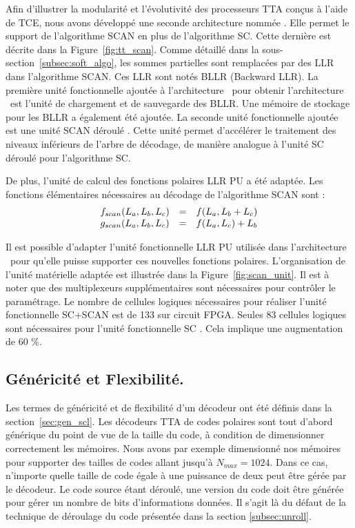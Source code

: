Afin d'illustrer la modularité et l'évolutivité des processeurs TTA conçus à l'aide de TCE, nous avons développé une seconde architecture nommée \TTSCAN. Elle permet le support de l'algorithme SCAN en plus de l'algorithme SC. Cette dernière est décrite dans la Figure~\ref{fig:tt_scan}.
Comme détaillé dans la sous-section~\ref{subsec:soft_algo}, les sommes partielles sont remplacées par des LLR dans l'algorithme SCAN. Ces LLR sont notés BLLR (Backward LLR). La première unité fonctionnelle ajoutée à l'architecture \TTSC~pour obtenir l'architecture \TTSCAN~est l'unité de chargement et de sauvegarde des BLLR. Une mémoire de stockage pour les BLLR a également été ajoutée. La seconde unité fonctionnelle ajoutée est une unité \og SCAN déroulé \fg. Cette unité permet d'accélérer le traitement des niveaux inférieurs de l'arbre de décodage, de manière analogue à l'unité \og SC déroulé \fg pour l'algorithme SC.

De plus, l'unité de calcul des fonctions polaires LLR PU a été adaptée. Les fonctions élémentaires nécessaires au décodage de l'algorithme SCAN sont : 
\begin{eqnarray}
  \begin{array}{l c l}
    f_{scan}(L_a,L_b,L_c) & = & f(L_a, L_b  + L_c) \\
    g_{scan}(L_a,L_b,L_c) & = & f(L_a, L_c) + L_b
  \end{array}
  \label{eq:bp}
\end{eqnarray}


Il est possible d'adapter l'unité fonctionnelle LLR PU utilisée dans l'architecture \TTSC~pour qu'elle puisse supporter ces nouvelles fonctions polaires. L'organisation de l'unité matérielle adaptée est illustrée dans la Figure~\ref{fig:scan_unit}. Il est à noter que des multiplexeurs supplémentaires sont nécessaires pour contrôler le paramétrage. Le nombre de cellules logiques nécessaires pour réaliser l'unité fonctionnelle \og SC+SCAN \fg est de 133 sur circuit FPGA. Seules 83 cellules logiques sont nécessaires pour l'unité fonctionnelle \og SC \fg. Cela implique une augmentation de 60 \%.

\subsection{Généricité et Flexibilité.}
Les termes de généricité et de flexibilité d'un décodeur ont été définis dans la section~\ref{sec:gen_scl}. Les décodeurs TTA de codes polaires sont tout d'abord générique du point de vue de la taille du code, à condition de dimensionner correctement les mémoires. Nous avons par exemple dimensionné nos mémoires pour supporter des tailles de codes allant jusqu'à $N_{max}=1024$. Dans ce cas, n'importe quelle taille de code égale à une puissance de deux peut être gérée par le décodeur. Le code source étant déroulé, une version du code doit être générée pour gérer un nombre de bits d'informations données. Il s'agit là du défaut de la technique de déroulage du code présentée dans la section \ref{subsec:unroll}.


